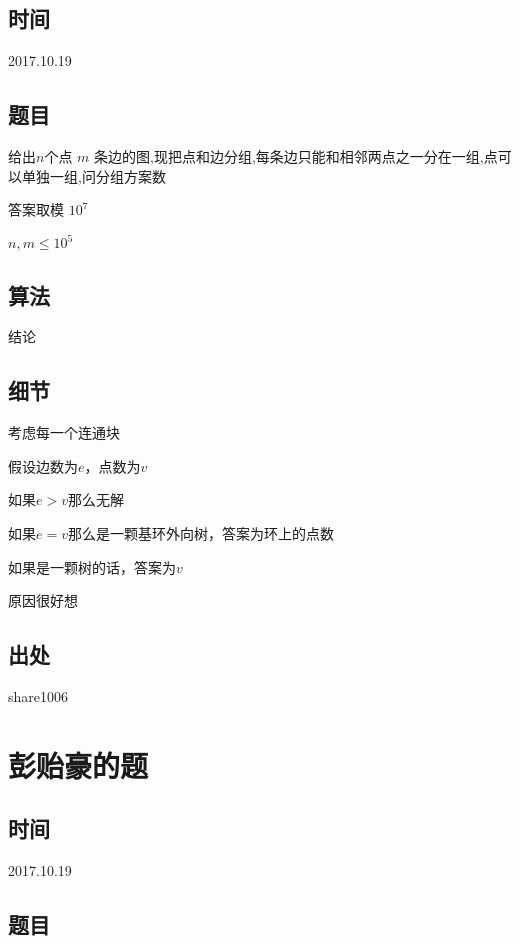 \documentclass[a4paper]{article}
\begin{document}
	\subsection{时间}
		
		2017.10.19
		
	\subsection{题目}
		
		给出$ n $个点 $m$ 条边的图,现把点和边分组,每条边只能和相邻两点之一分在一组,点可以单独一组,问分组方案数
		
		答案取模 $10^7$
		
		$n,m \leq 10^5$
		
	\subsection{算法}
		
		结论
		
	\subsection{细节}
		
		考虑每一个连通块
		
		假设边数为$e$，点数为$v$
		
		如果$e > v$那么无解
		
		如果$e = v$那么是一颗基环外向树，答案为环上的点数
		
		如果是一颗树的话，答案为$v$
		
		原因很好想
		
	\subsection{出处}
		
		share1006
	
	\newpage
	
	\section{彭贻豪的题}
		
	\subsection{时间}
		
		2017.10.19
		
	\subsection{题目}
		
\end{document}
